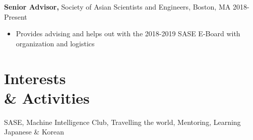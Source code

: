 \documentclass[margin]{res}
\begin{document}
\begin{resume}
\begin{itemize}
		 \end{itemize}
            {\bf Senior Advisor,} Society of Asian Scientists and Engineers, Boston, MA \hfill 2018-Present
            \begin{itemize} \itemsep -0.5pt
                \item Provides advising and helps out with the 2018-2019 SASE E-Board with organization and logistics 
            \end{itemize}

 
\section{Interests \\ \& Activities}
SASE, Machine Intelligence Club, Travelling the world, Mentoring, Learning Japanese \& Korean
\end{resume} 
\end{document}
